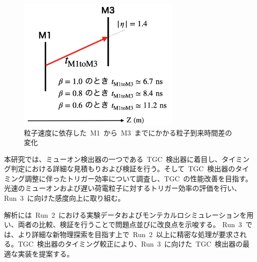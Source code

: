 \begin{figure}[H]
        \centering   
        \includegraphics[width=0.7\textwidth,page=4]{img/pdf3/time.png}
        \caption{粒子速度に依存した~M1~から~M3~までにかかる粒子到来時間差の変化}
        \label{fig:time}
\end{figure}

本研究では、ミューオン検出器の一つである~TGC~検出器に着目し、タイミング判定における詳細な見積もりおよび検証を行う。そして~TGC~検出器のタイミング調整に伴ったトリガー効率について調査し、TGC~の性能改善を目指す。光速のミューオンおよび遅い荷電粒子に対するトリガー効率の評価を行い、Run~3~に向けた感度向上に取り組む。

解析には~Run~2~における実験データおよびモンテカルロシミュレーションを用い、両者の比較、検証を行うことで問題点並びに改良点を示唆する。
Run~3~では、より詳細な新物理探索を目指す上で~Run~2~以上に精密な処理が要求される。TGC~検出器のタイミング較正により、Run~3~に向けた~TGC~検出器の最適な実装を提案する。
